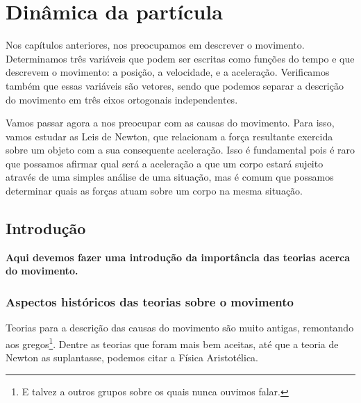 \chapter{Dinâmica da partícula}
\label{Chap:Dinâmica}


\begin{fullwidth}
{\it

Nos capítulos anteriores, nos preocupamos em descrever o movimento. Determinamos três variáveis que podem ser escritas como funções do tempo e que descrevem o movimento: a posição, a velocidade, e a aceleração. Verificamos também que essas variáveis são vetores, sendo que podemos separar a descrição do movimento em três eixos ortogonais independentes.

Vamos passar agora a nos preocupar com as causas do movimento. Para isso, vamos estudar as Leis de Newton, que relacionam a força resultante exercida sobre um objeto com a sua consequente aceleração. Isso é fundamental pois é raro que possamos afirmar qual será a aceleração a que um corpo estará sujeito através de uma simples análise de uma situação, mas é comum que possamos determinar quais as forças atuam sobre um corpo na mesma situação.
}
\end{fullwidth}

\section{Introdução}

\textbf{Aqui devemos fazer uma introdução da importância das teorias acerca do movimento.}

\subsection{Aspectos históricos das teorias sobre o movimento}

Teorias para a descrição das causas do movimento são muito antigas, remontando aos gregos\footnote{E talvez a outros grupos sobre os quais nunca ouvimos falar.}. Dentre as teorias que foram mais bem aceitas, até que a teoria de Newton as suplantasse, podemos citar a Física Aristotélica.

